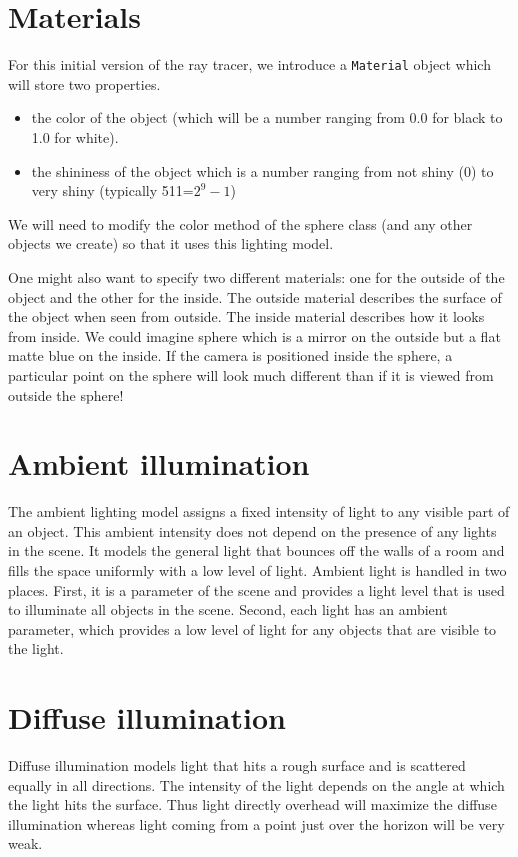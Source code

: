 \documentclass{book}
\begin{document}
\section{Materials}
For this initial version of the ray tracer, we introduce a {\tt Material} object which will store two properties.
\begin{itemize}
\item the color of the object (which will be a number ranging from 0.0 for black to 1.0 for white).
\item the shininess of the object which is a number ranging from not shiny (0) to very shiny (typically 511=$2^9-1$)
\end{itemize}
We will need to modify the color method of the sphere class (and any other objects we create) so that it uses this lighting model.

One might also want to specify two different materials: one for the outside of the object and the other for the inside. The outside material describes the surface of the object when seen from outside. The inside material describes how it looks from inside. We could imagine sphere which is a mirror on the outside but a flat matte blue on the inside. If the camera is positioned inside the sphere, a particular point on the sphere will look much different than if it is viewed from outside the sphere!

\section{Ambient illumination}
The ambient lighting model assigns a fixed intensity of light to any visible part
of an object. This ambient intensity does not depend on the presence of any lights
in the scene. It models the general light that bounces off the walls of a room
and fills the space uniformly with a low level of light. Ambient light is handled
in two places. First, it is a parameter of the scene and provides a light level
that is used to illuminate all objects in the scene. Second, each light has an
ambient parameter, which provides a low level of light for any objects that are
visible to the light.

\section{Diffuse illumination}
Diffuse illumination models light that hits a rough surface and is scattered
equally in all directions. The intensity of the light depends on the angle
at which the light hits the surface. Thus light directly overhead will
maximize the diffuse illumination whereas light coming from a point just over the
horizon will be very weak.
\end{document}
